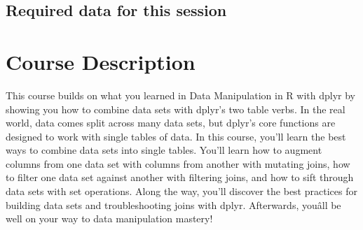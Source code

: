 \documentclass[]{article}
\newenvironment{Shaded}{\begin{snugshade}}{\end{snugshade}}
\newcommand{\KeywordTok}[1]{\textcolor[rgb]{0.13,0.29,0.53}{\textbf{#1}}}
\newcommand{\DataTypeTok}[1]{\textcolor[rgb]{0.13,0.29,0.53}{#1}}
\newcommand{\StringTok}[1]{\textcolor[rgb]{0.31,0.60,0.02}{#1}}
\newcommand{\CommentTok}[1]{\textcolor[rgb]{0.56,0.35,0.01}{\textit{#1}}}
\newcommand{\NormalTok}[1]{#1}
\begin{document}
\subsection{Required data for this
session}\label{required-data-for-this-session}

\begin{Shaded}
\end{Shaded}

\section{Course Description}\label{course-description}

This course builds on what you learned in Data Manipulation in R with
dplyr by showing you how to combine data sets with dplyr's two table
verbs. In the real world, data comes split across many data sets, but
dplyr's core functions are designed to work with single tables of data.
In this course, you'll learn the best ways to combine data sets into
single tables. You'll learn how to augment columns from one data set
with columns from another with mutating joins, how to filter one data
set against another with filtering joins, and how to sift through data
sets with set operations. Along the way, you'll discover the best
practices for building data sets and troubleshooting joins with dplyr.
Afterwards, youâll be well on your way to data manipulation mastery!
\end{document}
